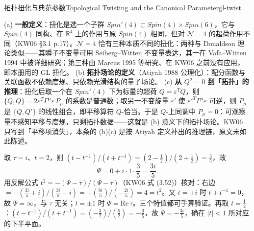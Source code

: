 \begin{centry}{拓扑扭化与典范参数}{Topological Twisting and the Canonical Parameter}{gl-twist}
\begin{remark}
(a) {\bf 一般定义}：扭化是选一个子群 $Spin'(4)\subset Spin(4)\times Spin(6)$，它与 $Spin(4)$ 同构、在 $\mathbb R^4$ 上的作用与原 $Spin(4)$ 相同，但对 $\mathcal N=4$ 的超荷作用不同（KW06 §3.1 p.17）。$\mathcal N=4$ 恰有三种本质不同的扭化：两种与 Donaldson 理论类似——其瞬子不变量可用 Seiberg--Witten 不变量表达，其一在 Vafa--Witten 1994 中被详细研究；第三种由 Marcus 1995 等研究、在 KW06 之前没有应用，即本册用的 GL 扭化。
(b) {\bf 拓扑场论的定义}（Atiyah 1988 公理化）：配分函数与关联函数不依赖度规、只依赖光滑结构的量子场论。
(c) {\bf 从 $Q^{2}=0$ 到「拓扑」的推理}：扭化后取一个在 $Spin'(4)$ 下为标量的超荷 $Q=\varepsilon^{T}Q$，则 $\{Q,Q\}=2\varepsilon^{T}\Gamma^{\mu}\varepsilon\,P_{\mu}$ 的系数是普通数；取另一不变旋量 $\varepsilon'$ 使 $\varepsilon'^{T}\Gamma^{\mu}\varepsilon$ 可逆，则 $P_{\mu}$ 是 $\{Q,Q'\}$ 的线性组合，即平移算符 $Q$-恰当。于是 $Q$-上同调中 $P_{\mu}=0$：可观察量不感知平移与度规，只剩拓扑数据——这就是 (b) 意义下的拓扑场论。KW06 只写到「平移项消失」，本条的 (b)(c) 是按 Atiyah 定义补出的推理链，原文未如此陈述。
\end{remark}


\begin{example}[$\tau=i$，$t=2$]
取 $\tau=i$、$t=2$，则 $(t-t^{-1})/(t+t^{-1})=(2-\tfrac12)/(2+\tfrac12)=\tfrac{3}{5}$，故
\[
\Psi=0+i\cdot1\cdot\frac{3}{5}=\frac{3i}{5}.
\]
用反解公式 $t^{2}=-(\Psi-\bar\tau)/(\Psi-\tau)$（KW06 式 (3.52)）核对：右边 $=-(\tfrac{3i}{5}+i)/(\tfrac{3i}{5}-i)=-(\tfrac{8i}{5})/(-\tfrac{2i}{5})=4=t^{2}$。又 $t=\pm i$ 时 $t+t^{-1}=0$，故 $\Psi=\infty$，与 $\tau$ 无关；$t=\pm1$ 时 $\Psi=\mathrm{Re}\,\tau$。三个特值都可手算验证。再取 $t=\tfrac12$：$(t-t^{-1})/(t+t^{-1})=(-\tfrac32)/(\tfrac52)=-\tfrac35$，故 $\Psi=-\tfrac{3i}{5}$，确在 $|t|<1$ 所对应的下半平面。
\end{example}


\end{centry}
